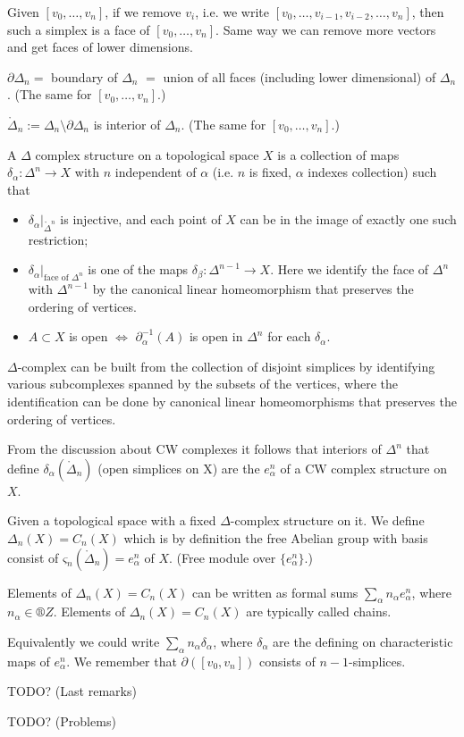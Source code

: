 \documentclass[12pt]{article}					%
\begin{document}
\begin{definice}
	Given $[v_0, …, v_n]$, if we remove $v_i$, i.e. we write $[v_0, …, v_{i-1}, v_{i-2}, …, v_n]$, then such a simplex is a face of $[v_0, …, v_n]$. Same way we can remove more vectors and get faces of lower dimensions.

	$\partial Δ_n =$ boundary of $Δ_n$ $=$ union of all faces (including lower dimensional) of $Δ_n$. (The same for $[v_0, …, v_n]$.)

	$\mathring Δ_n := Δ_n \setminus \partial Δ_n$ is interior of $Δ_n$. (The same for $[v_0, …, v_n]$.)
\end{definice}

\begin{definice}
	A $Δ$ complex structure on a topological space $X$ is a collection of maps $δ_α: Δ^n \rightarrow X$ with $n$ independent of $α$ (i.e. $n$ is fixed, $α$ indexes collection) such that
	\begin{itemize}
		\item $δ_α |_{\mathring Δ^n}$ is injective, and each point of $X$ can be in the image of exactly one such restriction;
		\item $δ_α |_{\text{face of $Δ^n$}}$ is one of the maps $δ_β: Δ^{n - 1} \rightarrow X$. Here we identify the face of $Δ^n$ with $Δ^{n-1}$ by the canonical linear homeomorphism that preserves the ordering of vertices.
		\item $A \subset X$ is open $\Leftrightarrow$ $\partial_α^{-1}(A)$ is open in $Δ^n$ for each $δ_α$.
	\end{itemize}

	\begin{poznamkain}
		$Δ$-complex can be built from the collection of disjoint simplices by identifying various subcomplexes spanned by the subsets of the vertices, where the identification can be done by canonical linear homeomorphisms that preserves the ordering of vertices.

		From the discussion about CW complexes it follows that interiors of $Δ^n$ that define $δ_α(\mathring Δ_n)$ (open simplices on X) are the $e_α^n$ of a CW complex structure on $X$.
	\end{poznamkain}
\end{definice}

\begin{definice}
	Given a topological space with a fixed $Δ$-complex structure on it. We define $Δ_n(X) = C_n(X)$ which is by definition the free Abelian group with basis consist of $ς_n(\mathring Δ_n) = e_α^n$ of $X$. (Free module over $\{e_α^n\}$.)

	\begin{poznamkain}
		Elements of $Δ_n(X) = C_n(X)$ can be written as formal sums $\sum_α n_α e_α^n$, where $n_α \in ®Z$. Elements of $Δ_n(X) = C_n(X)$ are typically called chains.

		Equivalently we could write $\sum_α n_α δ_α$, where $δ_α$ are the defining on characteristic maps of $e_α^n$. We remember that $\partial([v_0, v_n])$ consists of $n-1$-simplices.
	\end{poznamkain}
\end{definice}

TODO? (Last remarks)


TODO? (Problems)
\end{document}
